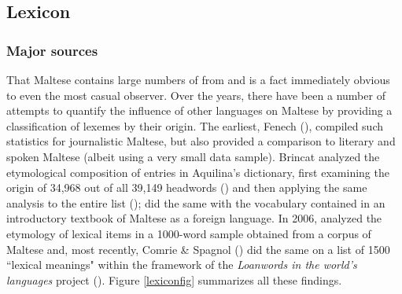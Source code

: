 \documentclass[output=paper]{langsci/langscibook}
\begin{document}


\subsection{Lexicon} \label{mtlexicon} %
\subsubsection{Major sources}
That Maltese contains large numbers of  from  and  is a fact immediately obvious to even the most casual observer. Over the years, there have been a number of attempts to quantify the influence of other languages on Maltese by providing a classification of lexemes by their origin. The earliest, Fenech (\citeyear[216--217]{fenech1978}), compiled such statistics for journalistic Maltese, but also provided a comparison to literary and spoken Maltese (albeit using a very small data sample). Brincat analyzed the etymological composition of entries in Aquilina's dictionary, first examining the origin of 34,968 out of all 39,149 headwords (\citealt[115]{brincat1996}) and then applying the same analysis to the entire list (\citealt[407]{brincat2011});  \cite{mifsudborg1997} did the same with the vocabulary contained in an introductory textbook of Maltese as a foreign language. In 2006, \cite{bovingdondalli2006} analyzed the etymology of lexical items in a 1000-word sample obtained from a corpus of Maltese and, most recently, Comrie \& Spagnol (\citeyear[318]{comriespagnol2016}) did the same on a list of 1500 ``lexical meanings" within the framework of the \textit{Loanwords in the world’s languages} project (\citealt{HaspelmathTadmor2009}). Figure \ref{lexiconfig} summarizes all these findings.
\end{document}

